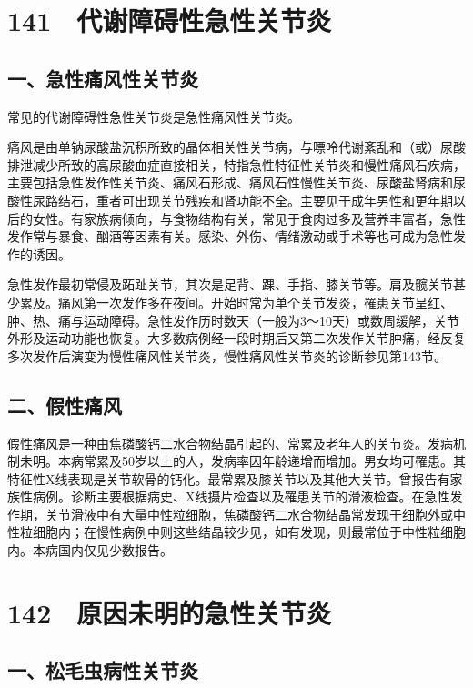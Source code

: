 \protect\hypertarget{text00325.html}{}{}

\section{141　代谢障碍性急性关节炎}

\subsection{一、急性痛风性关节炎}

常见的代谢障碍性急性关节炎是急性痛风性关节炎。

痛风是由单钠尿酸盐沉积所致的晶体相关性关节病，与嘌呤代谢紊乱和（或）尿酸排泄减少所致的高尿酸血症直接相关，特指急性特征性关节炎和慢性痛风石疾病，主要包括急性发作性关节炎、痛风石形成、痛风石性慢性关节炎、尿酸盐肾病和尿酸性尿路结石，重者可出现关节残疾和肾功能不全。主要见于成年男性和更年期以后的女性。有家族病倾向，与食物结构有关，常见于食肉过多及营养丰富者，急性发作常与暴食、酗酒等因素有关。感染、外伤、情绪激动或手术等也可成为急性发作的诱因。

急性发作最初常侵及跖趾关节，其次是足背、踝、手指、膝关节等。肩及髋关节甚少累及。痛风第一次发作多在夜间。开始时常为单个关节发炎，罹患关节呈红、肿、热、痛与运动障碍。急性发作历时数天（一般为3～10天）或数周缓解，关节外形及运动功能也恢复。大多数病例经一段时期后又第二次发作关节肿痛，经反复多次发作后演变为慢性痛风性关节炎，慢性痛风性关节炎的诊断参见第143节。

\subsection{二、假性痛风}

假性痛风是一种由焦磷酸钙二水合物结晶引起的、常累及老年人的关节炎。发病机制未明。本病常累及50岁以上的人，发病率因年龄递增而增加。男女均可罹患。其特征性X线表现是关节软骨的钙化。最常累及膝关节以及其他大关节。曾报告有家族性病例。诊断主要根据病史、X线摄片检查以及罹患关节的滑液检查。在急性发作期，关节滑液中有大量中性粒细胞，焦磷酸钙二水合物结晶常发现于细胞外或中性粒细胞内；在慢性病例中则这些结晶较少见，如有发现，则最常位于中性粒细胞内。本病国内仅见少数报告。

\protect\hypertarget{text00326.html}{}{}

\section{142　原因未明的急性关节炎}

\subsection{一、松毛虫病性关节炎}

